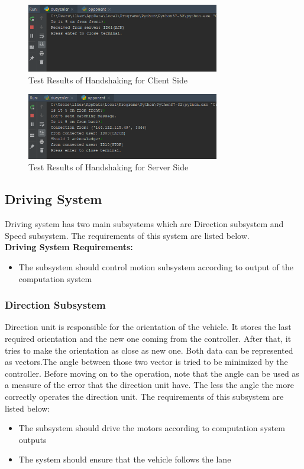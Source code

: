 \documentclass[a4paper,12pt]{article}
\begin{document}
	\begin{figure}[H]
		\center
		\setlength{\unitlength}{\textwidth} 				\includegraphics[width=0.75\textwidth]{images/handshake1}
		\caption{\label{fig:handshake1}Test Results of Handshaking for Client Side}
	\end{figure}
	
	\begin{figure}[H]
		\center
		\setlength{\unitlength}{\textwidth} 
		\includegraphics[width=0.75\textwidth]{images/handshake2}
		\caption{\label{fig:handshake2}Test Results of Handshaking for Server Side}
	\end{figure}	
	
	\subsection{Driving System}
	
	Driving system has two main subsystems which are Direction subsystem and Speed subsystem. The requirements of this system are listed below.\\
	
	\textbf{Driving System Requirements:}
	\begin{itemize}
		\item The subsystem should control motion subsystem according to output of the computation system
	\end{itemize}
	
	
	\subsubsection{Direction Subsystem}
	Direction unit is responsible for the orientation of the vehicle. It stores the last required orientation and the new one coming from the controller. After that, it tries to make the orientation as close as new one. Both data can be represented as vectors.The angle between those two vector is tried to be minimized by the controller. Before moving on to the operation, note that the angle can be used as a measure of the error that the direction unit have. The less the angle the more correctly operates the direction unit. The requirements of this subsystem are listed below:
	\begin{itemize}
		\item The subsystem should drive the motors according to computation system outputs
		\item The system should ensure that the vehicle follows the lane 
	\end{itemize}
	
\end{document}
